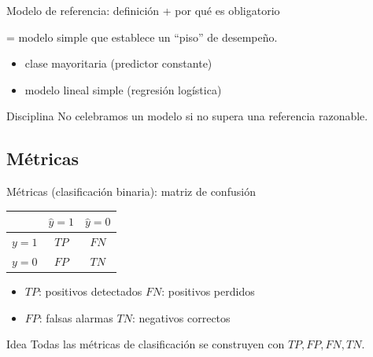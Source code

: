 \begin{frame}{Modelo de referencia: definición + por qué es obligatorio}

 = modelo simple que establece un “piso” de desempeño.
\begin{itemize}
  \item {} clase mayoritaria (predictor constante)
  \item {} modelo lineal simple (regresión logística)
\end{itemize}

\begin{block}{Disciplina}
No celebramos un modelo si no supera una referencia razonable.
\end{block}
\end{frame}

\subsection{Métricas}

\begin{frame}{Métricas (clasificación binaria): matriz de confusión}

\small
\begin{center}
\renewcommand{\arraystretch}{1.25}
\begin{tabular}{c|cc}
 & \(\hat{y}=1\) & \(\hat{y}=0\)\\ \hline
\(y=1\) & \(TP\) & \(FN\)\\
\(y=0\) & \(FP\) & \(TN\)\\
\end{tabular}
\end{center}

\vspace{0.2em}
\begin{itemize}\setlength{\itemsep}{0.35em}
  \item \(TP\): positivos detectados \quad \(FN\): positivos perdidos
  \item \(FP\): falsas alarmas \quad \(TN\): negativos correctos
\end{itemize}

\begin{block}{Idea}
Todas las métricas de clasificación se construyen con \(TP,FP,FN,TN\).
\end{block}
\end{frame}

